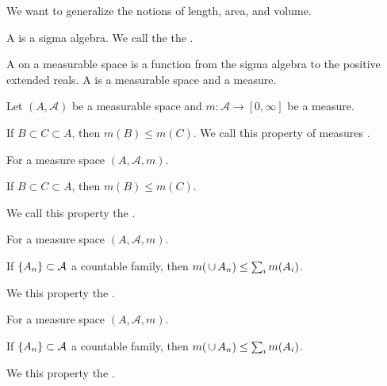 
\sbasic



\sstart



We want to generalize the notions
of length, area, and volume.


A
is a sigma algebra.
We call the
the .

A
on a measurable space
is a function from the sigma algebra
to the positive extended reals.
A
is a measurable space and a measure.



\begin{prop}
  Let $(A, \mathcal{A})$ be a measurable space and
  $m: \mathcal{A} \to [0, \infty]$ be a measure.

  If $B \subset C \subset A$, then $m(B) \leq m(C)$.
  We call this property of measures
  .
\end{prop}

\begin{prop}
  For a measure space $(A, \mathcal{A}, m)$.

  If $B \subset C \subset A$, then $m(B) \leq m(C)$.

  We call this property the
  .
\end{prop}

\begin{prop}
  For a measure space $(A, \mathcal{A}, m)$.

  If $\{A_n\} \subset \mathcal{A}$ a countable family,
  then $m(\,\cup\, A_n) \leq \sum_{i} m(A_i)$.

  We this property the
  .
\end{prop}

\begin{prop}
  For a measure space $(A, \mathcal{A}, m)$.

  If $\{A_n\} \subset \mathcal{A}$ a countable family,
  then $m(\,\cup\, A_n) \leq \sum_{i} m(A_i)$.

  We this property the
  .
\end{prop}

